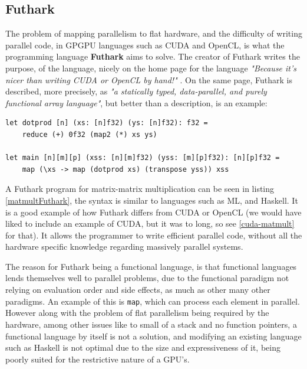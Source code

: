 \subsection{Futhark}
The problem of mapping parallelism to flat hardware, and the difficulty of writing parallel code, in GPGPU languages such as CUDA and OpenCL, is what the programming language \textbf{Futhark} aims to solve. The creator of Futhark writes the purpose, of the language, nicely on the home page for the language \textit{"Because it’s nicer than writing CUDA or OpenCL by hand!"} \cite{futhark-home}. On the same page, Futhark is described, more precisely, as \textit{"a statically typed, data-parallel, and purely functional array language"}, but better than a description, is an example:
\begin{center}
\lstset{language=haskell}
\begin{lstlisting}
let dotprod [n] (xs: [n]f32) (ys: [n]f32): f32 =
	reduce (+) 0f32 (map2 (*) xs ys)

let main [n][m][p] (xss: [n][m]f32) (yss: [m][p]f32): [n][p]f32 =
	map (\xs -> map (dotprod xs) (transpose yss)) xss
\end{lstlisting}%
\label{matmultFuthark}
\end{center}
A Futhark program for matrix-matrix multiplication can be seen in listing \ref{matmultFuthark}, the syntax is similar to languages such as ML, and Haskell. It is a good example of how Futhark differs from CUDA or OpenCL (we would have liked to include an example of CUDA, but it was to long, so see \ref{cuda-matmult} for that). It allows the programmer to write efficient parallel code, without all the hardware specific knowledge regarding massively parallel systems. 

The reason for Futhark being a functional language, is that functional languages lends themselves well to parallel problems, due to the functional paradigm not relying on evaluation order and side effects, as much as other many other paradigms. An example of this is \texttt{map}, which can process each element in parallel. However along with the problem of flat parallelism being required by the hardware, among other issues like to small of a stack and no function pointers, a functional language by itself is not a solution, and modifying an existing language such as Haskell is not optimal due to the size and expressiveness of it, being poorly suited for the restrictive nature of a GPU's. 

